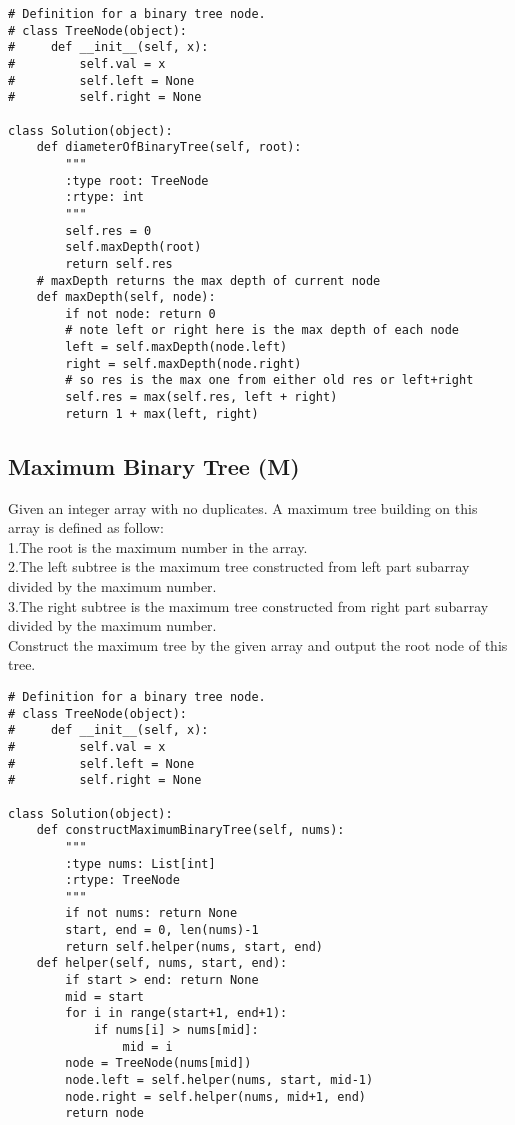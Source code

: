 \begin{lstlisting}
# Definition for a binary tree node.
# class TreeNode(object):
#     def __init__(self, x):
#         self.val = x
#         self.left = None
#         self.right = None

class Solution(object):
    def diameterOfBinaryTree(self, root):
        """
        :type root: TreeNode
        :rtype: int
        """
        self.res = 0
        self.maxDepth(root)
        return self.res
    # maxDepth returns the max depth of current node
    def maxDepth(self, node):
        if not node: return 0
        # note left or right here is the max depth of each node
        left = self.maxDepth(node.left)
        right = self.maxDepth(node.right)
        # so res is the max one from either old res or left+right
        self.res = max(self.res, left + right)
        return 1 + max(left, right)
\end{lstlisting}


\subsection{Maximum Binary Tree (M)}
Given an integer array with no duplicates. A maximum tree building on this array is defined as follow:\\

1.The root is the maximum number in the array.\\
2.The left subtree is the maximum tree constructed from left part subarray divided by the maximum number.\\
3.The right subtree is the maximum tree constructed from right part subarray divided by the maximum number.\\

Construct the maximum tree by the given array and output the root node of this tree. \\

\begin{lstlisting}
# Definition for a binary tree node.
# class TreeNode(object):
#     def __init__(self, x):
#         self.val = x
#         self.left = None
#         self.right = None

class Solution(object):
    def constructMaximumBinaryTree(self, nums):
        """
        :type nums: List[int]
        :rtype: TreeNode
        """
        if not nums: return None
        start, end = 0, len(nums)-1
        return self.helper(nums, start, end)
    def helper(self, nums, start, end):
        if start > end: return None
        mid = start
        for i in range(start+1, end+1):
            if nums[i] > nums[mid]:
                mid = i
        node = TreeNode(nums[mid])
        node.left = self.helper(nums, start, mid-1)
        node.right = self.helper(nums, mid+1, end)
        return node
\end{lstlisting}


